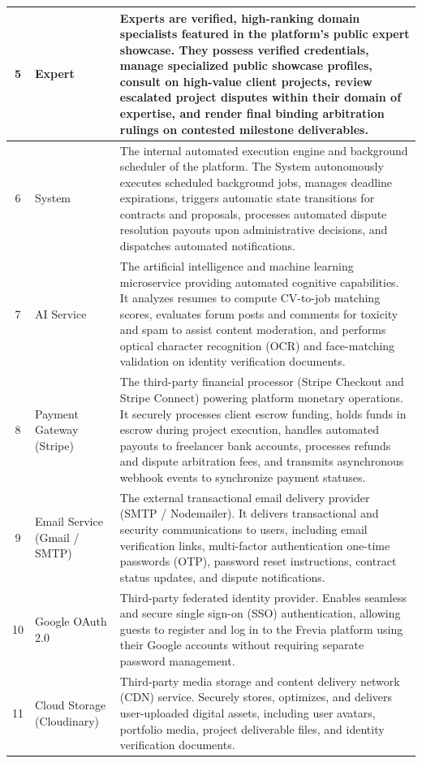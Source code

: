 \begin{longtable}{|c|>{\raggedright\arraybackslash}p{3.2cm}|p{10.5cm}|}
5 & Expert &
Experts are verified, high-ranking domain specialists featured in the platform's public expert showcase. They possess verified credentials, manage specialized public showcase profiles, consult on high-value client projects, review escalated project disputes within their domain of expertise, and render final binding arbitration rulings on contested milestone deliverables.
\\
\hline

6 & System &
The internal automated execution engine and background scheduler of the platform. The System autonomously executes scheduled background jobs, manages deadline expirations, triggers automatic state transitions for contracts and proposals, processes automated dispute resolution payouts upon administrative decisions, and dispatches automated notifications.
\\
\hline

7 & AI Service &
The artificial intelligence and machine learning microservice providing automated cognitive capabilities. It analyzes resumes to compute CV-to-job matching scores, evaluates forum posts and comments for toxicity and spam to assist content moderation, and performs optical character recognition (OCR) and face-matching validation on identity verification documents.
\\
\hline

8 & Payment Gateway (Stripe) &
The third-party financial processor (Stripe Checkout and Stripe Connect) powering platform monetary operations. It securely processes client escrow funding, holds funds in escrow during project execution, handles automated payouts to freelancer bank accounts, processes refunds and dispute arbitration fees, and transmits asynchronous webhook events to synchronize payment statuses.
\\
\hline

9 & Email Service (Gmail / SMTP) &
The external transactional email delivery provider (SMTP / Nodemailer). It delivers transactional and security communications to users, including email verification links, multi-factor authentication one-time passwords (OTP), password reset instructions, contract status updates, and dispute notifications.
\\
\hline

10 & Google OAuth 2.0 &
Third-party federated identity provider. Enables seamless and secure single sign-on (SSO) authentication, allowing guests to register and log in to the Frevia platform using their Google accounts without requiring separate password management.
\\
\hline

11 & Cloud Storage (Cloudinary) &
Third-party media storage and content delivery network (CDN) service. Securely stores, optimizes, and delivers user-uploaded digital assets, including user avatars, portfolio media, project deliverable files, and identity verification documents.
\\
\hline

\end{longtable}
\endgroup
